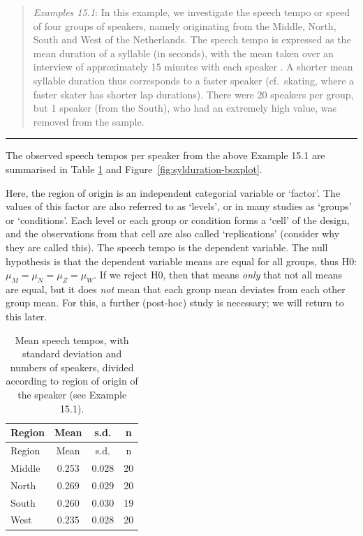 \documentclass[
]{book}
\begin{document}
\begin{quote}
\emph{Examples 15.1}: In this example, we investigate the speech tempo or
speed of four groups of speakers, namely originating from the Middle, North,
South and West of the Netherlands. The speech tempo is expressed as the mean
duration of a syllable (in seconds), with the mean taken over an interview of approximately
15 minutes with each speaker \citep{Quene08} \citep{R-hqmisc}.
A shorter mean syllable duration thus corresponds to a faster speaker (cf.~skating, where a faster skater has shorter lap durations). There were 20
speakers per group, but 1 speaker (from the South), who had an extremely high value,
was removed from the sample.
\end{quote}

\begin{center}\rule{0.5\linewidth}{0.5pt}\end{center}

The observed speech tempos per speaker from the above Example 15.1 are summarised
in Table \ref{tab:sylduration} and Figure~\ref{fig:sylduration-boxplot}.

Here, the region of origin is an independent categorial variable or `factor'.
The values of this factor are also referred to as `levels', or in many studies
as `groups' or `conditions'. Each level or each group or condition forms
a `cell' of the design, and the observations from that cell are also
called `replications' (consider why they are called this).
The speech tempo is the dependent variable. The null hypothesis is that the
dependent variable means are equal for all groups, thus
H0: \(\mu_M = \mu_N = \mu_Z = \mu_W\). If we reject H0, then that means
\emph{only} that not all means are equal, but it does \emph{not} mean that each group
mean deviates from each other group mean. For this, a further (post-hoc)
study is necessary; we will return to this later.

\begin{longtable}[]{@{}lccc@{}}
\caption{\label{tab:sylduration} Mean speech tempos, with standard deviation and numbers
of speakers, divided according to region of origin of the speaker (see Example
15.1).}\tabularnewline
\toprule
Region & Mean & s.d. & n\tabularnewline
\midrule
\endfirsthead
\toprule
Region & Mean & s.d. & n\tabularnewline
\midrule
\endhead
Middle & 0.253 & 0.028 & 20\tabularnewline
North & 0.269 & 0.029 & 20\tabularnewline
South & 0.260 & 0.030 & 19\tabularnewline
West & 0.235 & 0.028 & 20\tabularnewline
\bottomrule
\end{longtable}
\end{document}
